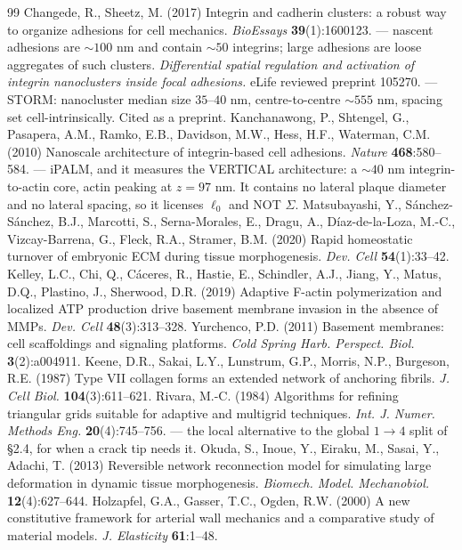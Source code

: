 \documentclass[10pt,a4paper]{article}
\begin{document}
{\begin{thebibliography}{99}
 Changede, R., Sheetz, M. (2017) Integrin and cadherin clusters: a robust
way to organize adhesions for cell mechanics. \emph{BioEssays} \textbf{39}(1):1600123. --- nascent
adhesions are $\sim\!100$ nm and contain $\sim\!50$ integrins; large adhesions are loose aggregates of
such clusters.
 \emph{Differential spatial regulation and activation of integrin
nanoclusters inside focal adhesions.} eLife reviewed preprint 105270. --- STORM: nanocluster median
size $35$--$40$ nm, centre-to-centre $\sim\!555$ nm, spacing set cell-intrinsically. Cited as a
preprint.
 Kanchanawong, P., Shtengel, G., Pasapera, A.M., Ramko, E.B., Davidson, M.W.,
Hess, H.F., Waterman, C.M. (2010) Nanoscale architecture of integrin-based cell adhesions.
\emph{Nature} \textbf{468}:580--584. --- iPALM, and it measures the VERTICAL architecture: a
$\sim\!40$ nm integrin-to-actin core, actin peaking at $z=97$ nm. It contains no lateral plaque
diameter and no lateral spacing, so it licenses $\ell_0$ and NOT $\Sigma$.
 Matsubayashi, Y., S\'anchez-S\'anchez, B.J., Marcotti, S., Serna-Morales, E.,
Dragu, A., D\'iaz-de-la-Loza, M.-C., Vizcay-Barrena, G., Fleck, R.A., Stramer, B.M. (2020) Rapid
homeostatic turnover of embryonic ECM during tissue morphogenesis. \emph{Dev. Cell} \textbf{54}(1):33--42.
 Kelley, L.C., Chi, Q., C\'aceres, R., Hastie, E., Schindler, A.J., Jiang, Y.,
Matus, D.Q., Plastino, J., Sherwood, D.R. (2019) Adaptive F-actin polymerization and localized ATP
production drive basement membrane invasion in the absence of MMPs. \emph{Dev. Cell} \textbf{48}(3):313--328.
 Yurchenco, P.D. (2011) Basement membranes: cell scaffoldings and signaling
platforms. \emph{Cold Spring Harb. Perspect. Biol.} \textbf{3}(2):a004911.
 Keene, D.R., Sakai, L.Y., Lunstrum, G.P., Morris, N.P., Burgeson, R.E. (1987)
Type VII collagen forms an extended network of anchoring fibrils. \emph{J. Cell Biol.}
\textbf{104}(3):611--621.
 Rivara, M.-C. (1984) Algorithms for refining triangular grids suitable for adaptive
and multigrid techniques. \emph{Int. J. Numer. Methods Eng.} \textbf{20}(4):745--756. --- the local
alternative to the global $1\!\to\!4$ split of \S2.4, for when a crack tip needs it.
 Okuda, S., Inoue, Y., Eiraku, M., Sasai, Y., Adachi, T. (2013) Reversible network
reconnection model for simulating large deformation in dynamic tissue morphogenesis.
\emph{Biomech. Model. Mechanobiol.} \textbf{12}(4):627--644.
 Holzapfel, G.A., Gasser, T.C., Ogden, R.W. (2000) A new constitutive framework for
arterial wall mechanics and a comparative study of material models. \emph{J. Elasticity} \textbf{61}:1--48.
\end{thebibliography}}
\end{document}
